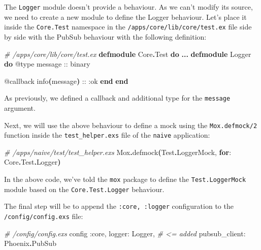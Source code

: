 \documentclass[
  oneside]{book}
\newenvironment{Shaded}{\begin{snugshade}}{\end{snugshade}}
\newcommand{\CommentTok}[1]{\textcolor[rgb]{0.56,0.35,0.01}{\textit{#1}}}
\newcommand{\ConstantTok}[1]{\textcolor[rgb]{0.56,0.35,0.01}{#1}}
\newcommand{\FunctionTok}[1]{\textcolor[rgb]{0.13,0.29,0.53}{\textbf{#1}}}
\newcommand{\KeywordTok}[1]{\textcolor[rgb]{0.13,0.29,0.53}{\textbf{#1}}}
\newcommand{\NormalTok}[1]{#1}
\newcommand{\OperatorTok}[1]{\textcolor[rgb]{0.81,0.36,0.00}{\textbf{#1}}}
\newcommand{\OtherTok}[1]{\textcolor[rgb]{0.56,0.35,0.01}{#1}}
\newcommand{\VariableTok}[1]{\textcolor[rgb]{0.00,0.00,0.00}{#1}}
\begin{document}
The \texttt{Logger} module doesn't provide a behaviour. As we can't modify its source, we need to create a new module to define the Logger behaviour. Let's place it inside the \texttt{Core.Test} namespace in the \texttt{/apps/core/lib/core/test.ex} file side by side with the PubSub behaviour with the following definition:

\begin{Shaded}
\begin{Highlighting}[]
\CommentTok{\# /apps/core/lib/core/test.ex}
\KeywordTok{defmodule} \ConstantTok{Core}\OperatorTok{.}\ConstantTok{Test} \KeywordTok{do}
  \OperatorTok{...}
  \KeywordTok{defmodule} \ConstantTok{Logger} \KeywordTok{do}
    \OtherTok{@type}\NormalTok{ message :: binary}

    \OtherTok{@callback}\NormalTok{ info}\FunctionTok{(}\NormalTok{message}\FunctionTok{)}\NormalTok{ :: }\VariableTok{:ok}
  \KeywordTok{end}
\KeywordTok{end}
\end{Highlighting}
\end{Shaded}

As previously, we defined a callback and additional type for the \texttt{message} argument.

Next, we will use the above behaviour to define a mock using the \texttt{Mox.defmock/2} function inside the \texttt{test\_helper.exs} file of the \texttt{naive} application:

\begin{Shaded}
\begin{Highlighting}[]
\CommentTok{\# /apps/naive/test/test\_helper.exs}
\ConstantTok{Mox}\OperatorTok{.}\NormalTok{defmock}\FunctionTok{(}\ConstantTok{Test}\OperatorTok{.}\ConstantTok{LoggerMock}\NormalTok{, }\KeywordTok{for}\NormalTok{: }\ConstantTok{Core}\OperatorTok{.}\ConstantTok{Test}\OperatorTok{.}\ConstantTok{Logger}\FunctionTok{)}
\end{Highlighting}
\end{Shaded}

In the above code, we've told the \texttt{mox} package to define the \texttt{Test.LoggerMock} module based on the \texttt{Core.Test.Logger} behaviour.

\newpage

The final step will be to append the \texttt{:core,\ :logger} configuration to the \texttt{/config/config.exs} file:

\begin{Shaded}
\begin{Highlighting}[]
\CommentTok{\# /config/config.exs}
\NormalTok{config }\VariableTok{:core}\NormalTok{,                                   }
  \VariableTok{logger:} \ConstantTok{Logger}\NormalTok{,                }\CommentTok{\# \textless{}= added}
  \VariableTok{pubsub\_client:} \ConstantTok{Phoenix}\OperatorTok{.}\ConstantTok{PubSub}
\end{Highlighting}
\end{Shaded}
\end{document}
